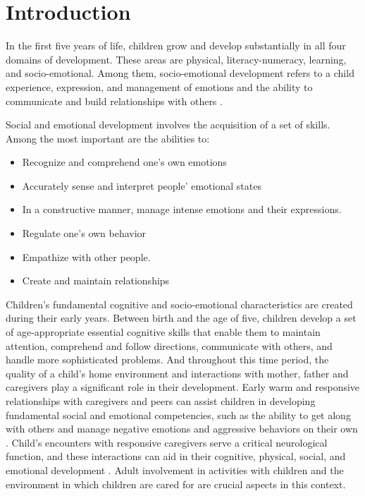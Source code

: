 \documentclass[
  12pt,
  oneside]{report}
\providecommand{\tightlist}{%
  \setlength{\itemsep}{0pt}\setlength{\parskip}{0pt}}
\begin{document}
{
\hypersetup{linkcolor=NavyBlue}
\setcounter{tocdepth}{1}
\tableofcontents
}
\newpage

\listoftables

\newpage


\hypertarget{introduction}{%
\chapter{Introduction}\label{introduction}}

In the first five years of life, children grow and develop substantially in all four domains of development. These areas are physical, literacy-numeracy, learning, and socio-emotional. Among them, socio-emotional development refers to a child experience, expression, and management of emotions and the ability to communicate and build relationships with others \citep{cohen2005early}.

Social and emotional development involves the acquisition of a set of skills. Among the most important are the abilities to:

\begin{itemize}
\tightlist
\item
  Recognize and comprehend one's own emotions
\item
  Accurately sense and interpret people' emotional states
\item
  In a constructive manner, manage intense emotions and their expressions.
\item
  Regulate one's own behavior
\item
  Empathize with other people.
\item
  Create and maintain relationships
\end{itemize}

Children's fundamental cognitive and socio-emotional characteristics are created
during their early years. Between birth and the age of five, children develop a set of age-appropriate essential cognitive skills that enable them to maintain attention, comprehend and follow directions, communicate with others, and handle more sophisticated problems. And throughout this time period, the quality of a child's home environment and interactions with mother, father and caregivers play a significant role in their development. Early warm and responsive relationships with caregivers and peers can assist children in developing fundamental social and emotional competencies, such as the ability to get along with others and manage negative emotions and aggressive behaviors on their own \citep{grantham2007developmental, walker2011inequality}. Child's encounters with responsive caregivers serve a critical neurological function, and these interactions can aid in their cognitive, physical, social, and emotional development \citep{britto2017nurturing}. Adult involvement in activities with children and the environment in which children are cared for are crucial aspects in this context.
\end{document}

